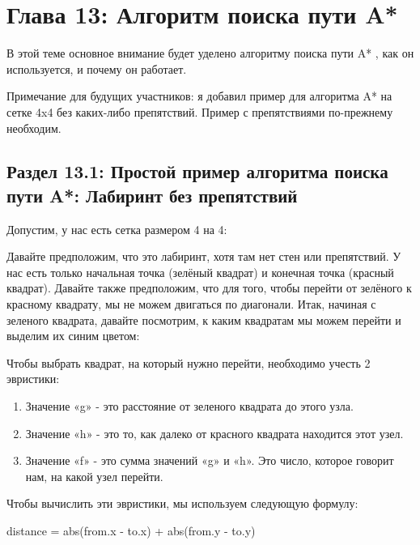 \chapter*{Глава 13: Алгоритм поиска пути A* }
В этой теме основное внимание будет уделено алгоритму поиска пути A* , как он используется, и почему он работает. 

Примечание для будущих участников: я добавил пример для алгоритма A* на сетке 4x4 без каких-либо препятствий. Пример с препятствиями по-прежнему необходим. 
\section*{Раздел 13.1: Простой пример алгоритма поиска пути A*: Лабиринт без препятствий}
Допустим, у нас есть сетка размером 4 на 4:

\vspace{\baselineskip}


Давайте предположим, что это лабиринт, хотя там нет стен или препятствий. У нас есть только начальная точка (зелёный квадрат) и конечная точка (красный квадрат). Давайте также предположим, что для того, чтобы перейти от зелёного к красному квадрату, мы не можем двигаться по диагонали. Итак, начиная с зеленого квадрата, давайте посмотрим, к каким квадратам мы можем перейти и выделим их синим цветом:

\vspace{\baselineskip}


Чтобы выбрать квадрат, на который нужно перейти, необходимо учесть 2 эвристики:
\begin{enumerate}
    \item Значение «g» - это расстояние от зеленого квадрата до этого узла.
    \item Значение «h» - это то, как далеко от красного квадрата находится этот узел.
    \item Значение «f» - это сумма значений «g» и «h». Это число, которое говорит нам, на какой узел перейти.
\end{enumerate}

Чтобы вычислить эти эвристики, мы используем следующую формулу:
\colorbox{gray!10!white}{ \parbox{22em}{distance = abs(from.x - to.x) + abs(from.y - to.y)}}

\vspace{\baselineskip}

